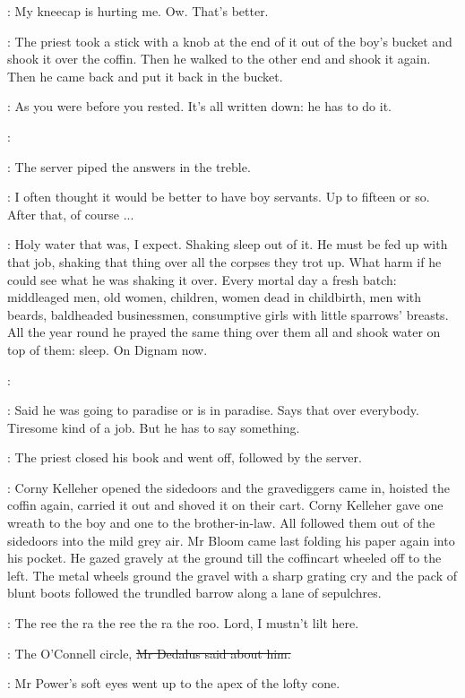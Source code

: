 \BloomInt:
My kneecap is hurting me.
Ow.
That's better.

:
The priest took a stick with a knob at the end of it
out of the boy's bucket and shook it over the coffin.
Then he walked to the other end and shook it again.
Then he came back and put it back in the bucket.

\BloomInt:
As you were before you rested.
It's all written down:
he has to do it.

\coffey:

:
The server piped the answers in the treble.

\BloomInt:
I often thought it would be better to have boy servants.
Up to fifteen or so.
After that, of course ...

\BloomInt:
Holy water that was, I expect.
Shaking sleep out of it.
He must be fed up with that job,
shaking that thing over all the corpses they trot up.
What harm if he could see what he was shaking it over.
Every mortal day a fresh batch:
middleaged men, old women, children,
women dead in childbirth,
men with beards, baldheaded businessmen,
consumptive girls with little sparrows' breasts.
All the year round
he prayed the same thing over them all and shook water on top of them:
sleep.
On Dignam now.

\coffey:

\BloomInt:
Said he was going to paradise or is in paradise.
Says that over everybody.
Tiresome kind of a job.
But he has to say something.

:
The priest closed his book and went off, followed by the server.

:
Corny Kelleher opened the sidedoors and the gravediggers came in,
hoisted the coffin again, carried it out and shoved it on their cart.
Corny Kelleher gave one wreath to the boy and one to the brother-in-law.
All followed them out of the sidedoors into the mild grey air.
Mr Bloom came last
folding his paper again into his pocket.
He gazed gravely at the ground
till the coffincart wheeled off to the left.
The metal wheels ground the gravel
with a sharp grating cry
and the pack of blunt boots followed the trundled barrow
along a lane of sepulchres.

\BloomInt:
The ree the ra the ree the ra the roo.
Lord, I mustn't lilt here.

\simon:
The O'Connell circle,
\sout{Mr Dedalus said about him.}

:
Mr Power's soft eyes went up to the apex of the lofty cone.

